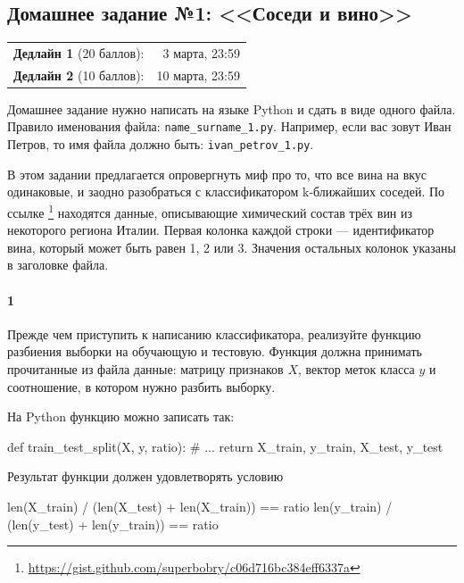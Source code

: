 \documentclass[a4paper,12pt]{article}
\begin{document}
\subsection*{Домашнее задание №1: <<Соседи и вино>>}

\begin{tabular}{@{}lr}
  \textbf{Дедлайн 1} (20 баллов): & 3 марта, 23:59 \\
  \textbf{Дедлайн 2} (10 баллов): & 10 марта, 23:59
\end{tabular}

Домашнее задание нужно написать на языке Python и сдать в виде одного файла.
Правило именования файла: \texttt{name\_surname\_1.py}. Например, если
вас зовут Иван Петров, то имя файла должно быть: \texttt{ivan\_petrov\_1.py}.

\makebox[\linewidth]{\hrulefill}

В этом задании предлагается опровергнуть миф про то, что все вина на вкус
одинаковые, и заодно разобраться с классификатором k-ближайших соседей. По ссылке%
\footnote{\url{https://gist.github.com/superbobry/c06d716bc384eff6337a}}
находятся данные, описывающие химический состав трёх вин из некоторого региона
Италии. Первая колонка каждой строки --- идентификатор вина, который может быть
равен 1, 2 или 3. Значения остальных колонок указаны в заголовке файла.

\paragraph{1} Прежде чем приступить к написанию классификатора, реализуйте
функцию разбиения выборки на обучающую и тестовую. Функция должна принимать
прочитанные из файла данные: матрицу признаков $X$, вектор меток класса $y$ и
соотношение, в котором нужно разбить выборку.

На Python функцию можно записать так:
\begin{python3}
def train_test_split(X, y, ratio):
    # ...
    return X_train, y_train, X_test, y_test
\end{python3}

Результат функции должен удовлетворять условию
\begin{python3}
len(X_train) / (len(X_test) + len(X_train)) == ratio
len(y_train) / (len(y_test) + len(y_train)) == ratio
\end{python3}
\end{document}
